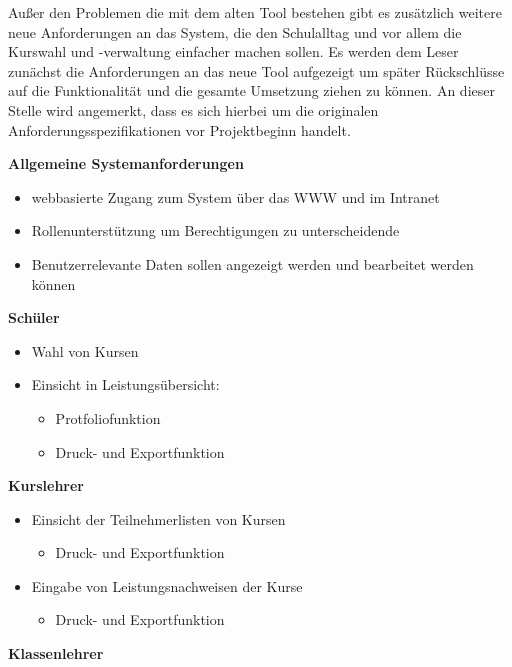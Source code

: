 Außer den Problemen die mit dem alten Tool bestehen gibt es zusätzlich weitere neue Anforderungen an das System, die den Schulalltag und vor allem die Kurswahl und -verwaltung einfacher machen sollen.
Es werden dem Leser zunächst die Anforderungen an das neue Tool aufgezeigt um später Rückschlüsse auf die Funktionalität und die gesamte Umsetzung ziehen zu können.
An dieser Stelle wird angemerkt, dass es sich hierbei um die originalen Anforderungsspezifikationen vor Projektbeginn handelt.

\textbf{Allgemeine Systemanforderungen}

\begin{itemize}
  \item webbasierte Zugang zum System über das \ac{WWW} und im Intranet
  \item Rollenunterstützung um Berechtigungen zu unterscheidende
  \item Benutzerrelevante Daten sollen angezeigt werden und bearbeitet werden können
\end{itemize}

\textbf{Schüler}

\begin{itemize}
  \item Wahl von Kursen
  \item Einsicht in Leistungsübersicht:
    \begin{itemize}
      \item Protfoliofunktion 
      \item Druck- und Exportfunktion
    \end{itemize}
\end{itemize}

\textbf{Kurslehrer}

\begin{itemize}
  \item Einsicht der Teilnehmerlisten von Kursen
  \begin{itemize}
    \item Druck- und Exportfunktion
  \end{itemize}
  \item Eingabe von Leistungsnachweisen der Kurse
  \begin{itemize}
    \item Druck- und Exportfunktion
  \end{itemize}
\end{itemize}

\textbf{Klassenlehrer}

